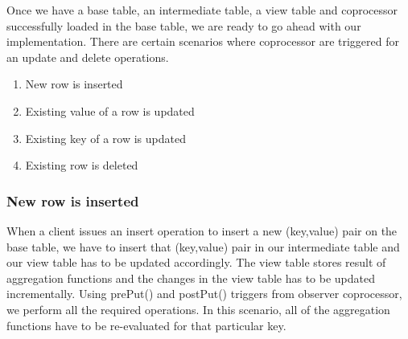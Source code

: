 \documentclass[11pt,a4paper,bibtotoc,idxtotoc,headsepline,footsepline,footexclude,BCOR12mm,DIV13]{scrbook}
\begin{document}


    

Once we have a base table, an intermediate table, a view table and coprocessor successfully loaded in the base table, we are ready to go ahead with our implementation. There are certain scenarios where coprocessor are triggered for an update and delete operations.

\begin{enumerate}
    \item New row is inserted
    \item Existing value of a row is updated
    \item Existing key of a row is updated
    \item Existing row is deleted
\end{enumerate}

\subsubsection{New row is inserted}
\label{Aggr: New Row Inserted}
When a client issues an insert operation to insert a new (key,value) pair on the base table, we have to insert that (key,value) pair in our intermediate table and our view table has to be updated accordingly. The view table stores result of aggregation functions and the changes in the view table has to be updated incrementally. Using prePut() and postPut() triggers from observer coprocessor, we perform all the required operations. In this scenario, all of the aggregation functions have to be re-evaluated for that particular key.
\end{document}

